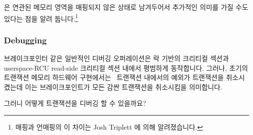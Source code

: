 \begin{enumerate}
\fi

\end{enumerate}

 은 연관된 메모리 영역을 매핑되지 않은 상태로 남겨두어서 추가적인
의미를 가질 수도 있다는 점을 알려 둡니다.\footnote{
	매핑과 언매핑의 이 차이는 Josh Triplett 에 의해 알려졌습니다.}

\subsubsection{Debugging}
\label{sec:future:Debugging}

브레이크포인터 같은 일반적인 디버깅 오퍼레이션은 락 기반의 크리티컬 섹션과
userspace-RCU read-side 크리티컬 섹션 내에서 평범하게 동작합니다.
그러나, 초기의 트랜잭션 메모리 하드웨어
구현에서는~\cite{DaveDice2009ASPLOSRockHTM} 트랜잭션 내에서의 예외가 트랜잭션을
취소시켰는데 이는 브레이크포인트가 모든 감싼 트랜잭션을 취소시킴을 의미합니다.

그러니 어떻게 트랜잭션을 디버깅 할 수 있을까요?

